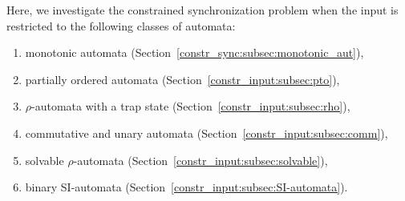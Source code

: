 

Here, we investigate the constrained synchronization problem when the input is restricted to the following classes of  automata:
\begin{enumerate} 
\item monotonic automata (Section~\ref{constr_sync:subsec:monotonic_aut}),
\item partially ordered automata (Section~\ref{constr_input:subsec:pto}),
\item $\rho$-automata with a trap state (Section~\ref{constr_input:subsec:rho}),
\item commutative and unary automata (Section~\ref{constr_input:subsec:comm}), 
\item solvable $\rho$-automata (Section~\ref{constr_input:subsec:solvable}),
\item binary SI-automata (Section~\ref{constr_input:subsec:SI-automata}).
\end{enumerate}

